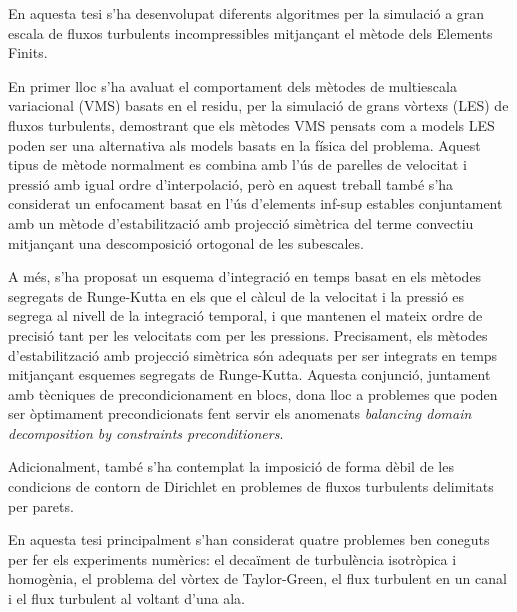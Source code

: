En aquesta tesi s'ha desenvolupat diferents algoritmes per la simulació a gran escala de fluxos turbulents incompressibles mitjançant el mètode dels Elements Finits.

En primer lloc s'ha avaluat el comportament dels mètodes de multiescala variacional (VMS) basats en el residu, per la simulació de grans vòrtexs (LES) de fluxos turbulents, demostrant que els mètodes VMS pensats com a models LES poden ser una alternativa als models basats en la física del problema. Aquest tipus de mètode normalment es combina amb l'ús de parelles de velocitat i pressió amb igual ordre d'interpolació, però en aquest treball també s'ha considerat un enfocament basat en l'ús d'elements inf-sup estables conjuntament amb un mètode d'estabilització amb projecció simètrica del terme convectiu mitjançant una descomposició ortogonal de les subescales. 

A més, s'ha proposat un esquema d'integració en temps basat en els mètodes segregats de Runge-Kutta en els que el càlcul de la velocitat i la pressió es segrega al nivell de la integració temporal, i que mantenen el mateix ordre de precisió tant per les velocitats com per les pressions. Precisament, els mètodes d'estabilització amb projecció simètrica són adequats per ser integrats en temps mitjançant esquemes segregats de Runge-Kutta. Aquesta conjunció, juntament amb tècniques de precondicionament en blocs, dona lloc a problemes que poden ser òptimament precondicionats fent servir els anomenats \textit{balancing domain decomposition by constraints preconditioners}.

Adicionalment, també s'ha contemplat la imposició de forma dèbil de les condicions de contorn de Dirichlet en problemes de fluxos turbulents delimitats per parets.

En aquesta tesi principalment s'han considerat quatre problemes ben coneguts per fer els experiments numèrics: el decaïment de turbulència isotròpica i homogènia, el problema del vòrtex de Taylor-Green, el flux turbulent en un canal i el flux turbulent al voltant d'una ala.


